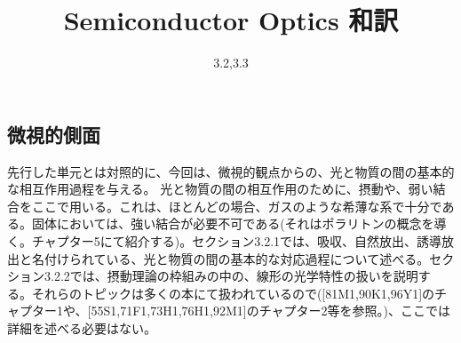 \documentclass[11pt,a4j,uplatex]{jsarticle}
\title{Semiconductor Optics 和訳}
\author{3.2,3.3}
\begin{document}
\maketitle %

\thispagestyle{empty}%
\clearpage
\addtocounter{page}{-1}


\tableofcontents %

\thispagestyle{empty}%
\clearpage
\addtocounter{page}{-1}

\fi
\setcounter{section}{3}
\setcounter{subsection}{1}
\setcounter{figure}{15}
\newpage
\subsection{微視的側面}
先行した単元とは対照的に、今回は、微視的観点からの、光と物質の間の基本的な相互作用過程を与える。
光と物質の間の相互作用のために、摂動や、弱い結合をここで用いる。これは、ほとんどの場合、ガスのような希薄な系で十分である。固体においては、強い結合が必要不可である(それはポラリトンの概念を導く。チャプター5にて紹介する)。セクション3.2.1では、吸収、自然放出、誘導放出と名付けられている、光と物質の間の基本的な対応過程について述べる。セクション3.2.2では、摂動理論の枠組みの中の、線形の光学特性の扱いを説明する。それらのトピックは多くの本にて扱われているので([81M1,90K1,96Y1]のチャプター1や、[55S1,71F1,73H1,76H1,92M1]のチャプター2等を参照。)、ここでは詳細を述べる必要はない。
\end{document}
